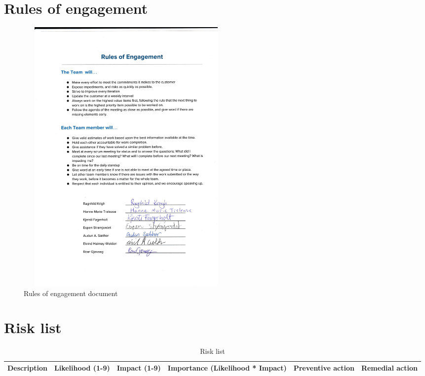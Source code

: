 \appendix
\begin{appendices}

\chapter{Rules of engagement}
\label{app:rules_of_engagement}
\begin{figure}[!h]
	\centering
	\includegraphics[trim=3cm 3.5cm 1.5cm 3cm,clip,height=13.9cm, width=11cm]{pdffig/RulesOfEngagement}
	\caption{Rules of engagement document}
	\label{fig:rules_of_engagement}
\end{figure}

\chapter{Risk list}
\label{app:risklist}


\begin{longtable}{ | p{3.5cm} | p{2cm} | p{1.5cm} | p{2cm} | p{3.5cm} | p{3.5cm} |}\caption{Risk list}\label{Tab:risklist}\\
	\hline
	\textbf{Description} & \textbf{Likelihood (1-9)} & \textbf{Impact (1-9)} & \textbf{Importance (Likelihood * Impact)} & \textbf{Preventive action} & \textbf{Remedial action} \\ \hline\endhead
	

\end{longtable}
\end{appendices}
